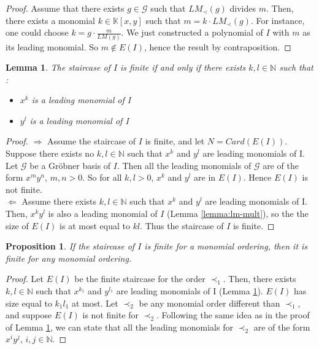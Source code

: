 \documentclass{article}
\newtheorem{lemma}{Lemma}[section]
\newtheorem{proposition}{Proposition}[section]
\begin{document}
\begin{proof}
    Assume that there exists $g \in \mathscr{G}$ such that $LM_{\prec}(g)$ divides $m$. Then, there exists a monomial $k \in \mathbb{K}[x, y]$ such that $m = k \cdot LM_{\prec}(g)$. For instance, one could choose $k = g \cdot \displaystyle \frac{m}{LM(g)}$. We just constructed a polynomial of $I$ with $m$ as its leading monomial. So $m \notin E(I)$, hence the result by contraposition.
\end{proof}

\begin{lemma} \label{lemma:finite-staircase-lm}
    The staircase of $I$ is finite if and only if there exists $k, l \in \mathbb{N}$ such that :
    \begin{itemize}
        \item $x^{k}$ is a leading monomial of I
        \item $y^{l}$ is a leading monomial of I
    \end{itemize}
\end{lemma}

\begin{proof} %
    $\Rightarrow$ Assume the staircase of $I$ is finite, and let $N = Card(E(I))$. Suppose there exists no $k, l \in \mathbb{N}$ such that $x^{k}$ and $y^{l}$ are leading monomials of I. Let $\mathscr{G}$ be a Gröbner basis of $I$. Then all the leading monomials of $\mathscr{G}$ are of the form $x^{m}y^{n}$, $m,n > 0$. So for all $k, l > 0$, $x^{k}$ and $y^{l}$ are in $E(I)$. Hence $E(I)$ is not finite. \\ 
    $\Leftarrow$ Assume there exists $k, l \in \mathbb{N}$ such that $x^{k}$ and $y^{l}$ are leading monomials of I. Then, $x^{k}y^{l}$ is also a leading monomial of $I$ (Lemma \ref{lemma:lm-mult}), so the the size of $E(I)$ is at most equal to $kl$. Thus the staircase of $I$ is finite.
\end{proof}

\begin{proposition} \label{proposition:staircase-finite-any-order}
    If the staircase of $I$ is finite for a monomial ordering, then it is finite for any monomial ordering.
\end{proposition}

\begin{proof} %
    Let $E(I)$ be the finite staircase for the order $\prec_{1}$. Then, there exists $k, l \in \mathbb{N}$ such that $x^{k_{1}}$ and $y^{l_{1}}$ are leading monomials of I (Lemma \ref{lemma:finite-staircase-lm}). $E(I)$ has size equal to $k_{1}l_{1}$ at most. Let $\prec_{2}$ be any monomial order different than $\prec_{1}$, and suppose $E(I)$ is not finite for $\prec_{2}$. Following the same idea as in the proof of Lemma \ref{lemma:finite-staircase-lm}, we can state that all the leading monomials for $\prec_{2}$ are of the form $x^{i}y^{j}$, $i, j \in \mathbb{N}$. 
\end{proof}
\end{document}
